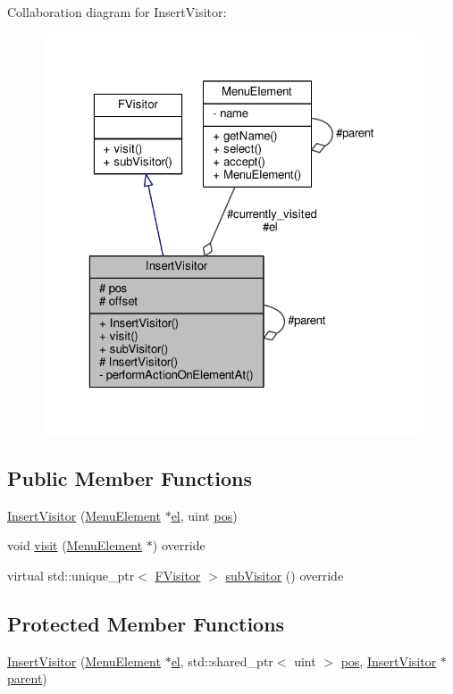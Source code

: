 Collaboration diagram for Insert\+Visitor\+:
\nopagebreak
\begin{figure}[H]
\begin{center}
\leavevmode
\includegraphics[width=323pt]{classInsertVisitor__coll__graph}
\end{center}
\end{figure}
\subsection*{Public Member Functions}
\begin{DoxyCompactItemize}
\item 
\hyperlink{classInsertVisitor_a33bed2522ab19248501fb405e3d02bff}{Insert\+Visitor} (\hyperlink{classMenuElement}{Menu\+Element} $\ast$\hyperlink{classInsertVisitor_a69e0d6193f75848df28ee23d538892fa}{el}, uint \hyperlink{classInsertVisitor_aeb7469f88fb024421c1dd9cfd3608d7d}{pos})
\item 
void \hyperlink{classInsertVisitor_a500b8f4ea580a84d0430b717ddd40d72}{visit} (\hyperlink{classMenuElement}{Menu\+Element} $\ast$) override
\item 
virtual std\+::unique\+\_\+ptr$<$ \hyperlink{classFVisitor}{F\+Visitor} $>$ \hyperlink{classInsertVisitor_a6257a7684631f6ce7cf15855eb99c8f5}{sub\+Visitor} () override
\end{DoxyCompactItemize}
\subsection*{Protected Member Functions}
\begin{DoxyCompactItemize}
\item 
\hyperlink{classInsertVisitor_afe0b93526e24543aef21ff47cd8cbbe9}{Insert\+Visitor} (\hyperlink{classMenuElement}{Menu\+Element} $\ast$\hyperlink{classInsertVisitor_a69e0d6193f75848df28ee23d538892fa}{el}, std\+::shared\+\_\+ptr$<$ uint $>$ \hyperlink{classInsertVisitor_aeb7469f88fb024421c1dd9cfd3608d7d}{pos}, \hyperlink{classInsertVisitor}{Insert\+Visitor} $\ast$\hyperlink{classInsertVisitor_a33db65fd081bd0448763274f1ca4632d}{parent})
\end{DoxyCompactItemize}
